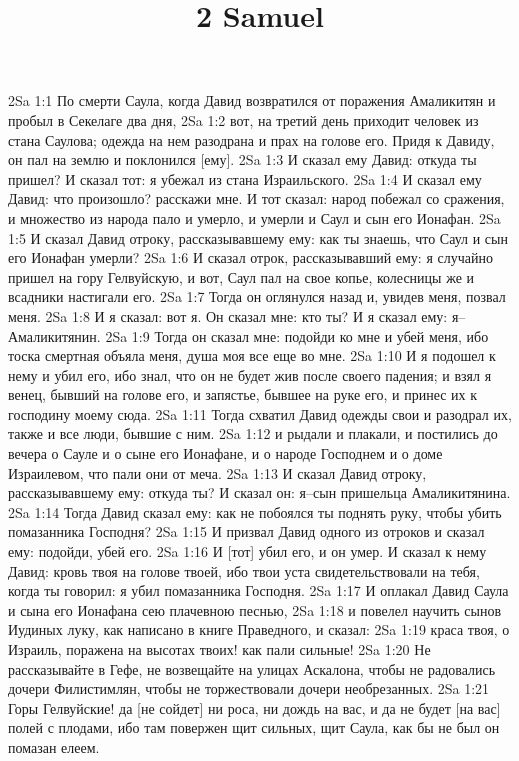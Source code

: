 

\title{2 Samuel}

2Sa 1:1  По смерти Саула, когда Давид возвратился от поражения Амаликитян и пробыл в Секелаге два дня,
2Sa 1:2  вот, на третий день приходит человек из стана Саулова; одежда на нем разодрана и прах на голове его. Придя к Давиду, он пал на землю и поклонился [ему].
2Sa 1:3  И сказал ему Давид: откуда ты пришел? И сказал тот: я убежал из стана Израильского.
2Sa 1:4  И сказал ему Давид: что произошло? расскажи мне. И тот сказал: народ побежал со сражения, и множество из народа пало и умерло, и умерли и Саул и сын его Ионафан.
2Sa 1:5  И сказал Давид отроку, рассказывавшему ему: как ты знаешь, что Саул и сын его Ионафан умерли?
2Sa 1:6  И сказал отрок, рассказывавший ему: я случайно пришел на гору Гелвуйскую, и вот, Саул пал на свое копье, колесницы же и всадники настигали его.
2Sa 1:7  Тогда он оглянулся назад и, увидев меня, позвал меня.
2Sa 1:8  И я сказал: вот я. Он сказал мне: кто ты? И я сказал ему: я--Амаликитянин.
2Sa 1:9  Тогда он сказал мне: подойди ко мне и убей меня, ибо тоска смертная объяла меня, душа моя все еще во мне.
2Sa 1:10  И я подошел к нему и убил его, ибо знал, что он не будет жив после своего падения; и взял я венец, бывший на голове его, и запястье, бывшее на руке его, и принес их к господину моему сюда.
2Sa 1:11  Тогда схватил Давид одежды свои и разодрал их, также и все люди, бывшие с ним.
2Sa 1:12  и рыдали и плакали, и постились до вечера о Сауле и о сыне его Ионафане, и о народе Господнем и о доме Израилевом, что пали они от меча.
2Sa 1:13  И сказал Давид отроку, рассказывавшему ему: откуда ты? И сказал он: я--сын пришельца Амаликитянина.
2Sa 1:14  Тогда Давид сказал ему: как не побоялся ты поднять руку, чтобы убить помазанника Господня?
2Sa 1:15  И призвал Давид одного из отроков и сказал ему: подойди, убей его.
2Sa 1:16  И [тот] убил его, и он умер. И сказал к нему Давид: кровь твоя на голове твоей, ибо твои уста свидетельствовали на тебя, когда ты говорил: я убил помазанника Господня.
2Sa 1:17  И оплакал Давид Саула и сына его Ионафана сею плачевною песнью,
2Sa 1:18  и повелел научить сынов Иудиных луку, как написано в книге Праведного, и сказал:
2Sa 1:19  краса твоя, о Израиль, поражена на высотах твоих! как пали сильные!
2Sa 1:20  Не рассказывайте в Гефе, не возвещайте на улицах Аскалона, чтобы не радовались дочери Филистимлян, чтобы не торжествовали дочери необрезанных.
2Sa 1:21  Горы Гелвуйские! да [не сойдет] ни роса, ни дождь на вас, и да не будет [на вас] полей с плодами, ибо там повержен щит сильных, щит Саула, как бы не был он помазан елеем.
